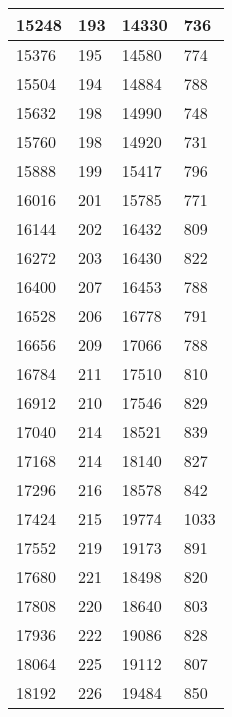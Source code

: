 \begin{longtable}{|l|l|l|l|}
		15248 & 193         & 14330           & 736              \\ \hline
		15376 & 195         & 14580           & 774              \\ \hline
		15504 & 194         & 14884           & 788              \\ \hline
		15632 & 198         & 14990           & 748              \\ \hline
		15760 & 198         & 14920           & 731              \\ \hline
		15888 & 199         & 15417           & 796              \\ \hline
		16016 & 201         & 15785           & 771              \\ \hline
		16144 & 202         & 16432           & 809              \\ \hline
		16272 & 203         & 16430           & 822              \\ \hline
		16400 & 207         & 16453           & 788              \\ \hline
		16528 & 206         & 16778           & 791              \\ \hline
		16656 & 209         & 17066           & 788              \\ \hline
		16784 & 211         & 17510           & 810              \\ \hline
		16912 & 210         & 17546           & 829              \\ \hline
		17040 & 214         & 18521           & 839              \\ \hline
		17168 & 214         & 18140           & 827              \\ \hline
		17296 & 216         & 18578           & 842              \\ \hline
		17424 & 215         & 19774           & 1033             \\ \hline
		17552 & 219         & 19173           & 891              \\ \hline
		17680 & 221         & 18498           & 820              \\ \hline
		17808 & 220         & 18640           & 803              \\ \hline
		17936 & 222         & 19086           & 828              \\ \hline
		18064 & 225         & 19112           & 807              \\ \hline
		18192 & 226         & 19484           & 850              \\ \hline

\end{longtable}
